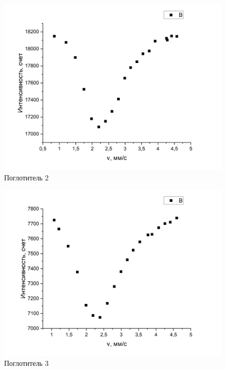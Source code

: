 \documentclass[a4paper, 12pt]{article}
\begin{document}
\begin{figure}[h!]
\begin{center}
\includegraphics[scale=0.5]{5} 
\caption{Поглотитель 2}
\end{center}
\end{figure}

\begin{figure}[h!]
\begin{center}
\includegraphics[scale=0.5]{6} 
\caption{Поглотитель 3}
\end{center}
\end{figure}
\end{document}
